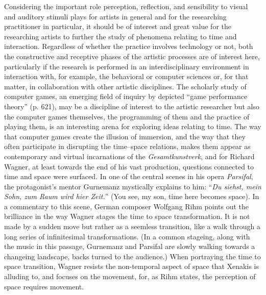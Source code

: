 Considering the important role perception, reflection, and sensibility to visual and auditory stimuli plays for artists in general and for the researching practitioner in particular, it should be of interest and great value for the researching artists to further the study of phenomena relating to time and interaction. Regardless of whether the practice involves technology or not, both the constructive and receptive phases of the artistic processes are of interest here, particularly if the research is performed in an interdisciplinary environment in interaction with, for example, the behavioral or computer sciences or, for that matter, in collaboration with other artistic disciplines. The scholarly study of computer games, an emerging field of inquiry by \citet{dixon07} depicted ``game performance theory'' (p. 621), may be a discipline of interest to the artistic researcher but also the computer games themselves, the programming of them and the practice of playing them, is an interesting arena for exploring ideas relating to time. The way that computer games create the illusion of immersion, and the way that they often participate in disrupting the time--space relations, makes them appear as contemporary and virtual incarnations of the \emph{Gesamtkunstverk}, and for Richard Wagner, at least towards the end of his vast production, questions connected to time and space were surfaced. In one of the central scenes in his opera \emph{Parsifal}, the protagonist's mentor Gurnemanz mystically explains to him: ``\emph{Du siehst, mein Sohn, zum Raum wird hier Zeit.}'' (You see, my son, time here becomes space). In a commentary to this scene\nocite{wagner82}, German composer Wolfgang Rihm points out the brilliance in the way Wagner stages the time to space transformation. It is not made by a sudden move but rather as a seemless transition, like a walk through a long series of infinitesimal transformations. (In a common stageing, along with the music in this passage, Gurnemanz and Parsifal are slowly walking towards a changeing landscape, backs turned to the audience.) When portraying the time to space transition, Wagner resists the non-temporal aspect of space that Xenakis is alluding to, and focuses on the movement, for, as Rihm states, the perception of space requires movement. \citep{rihm01} 

